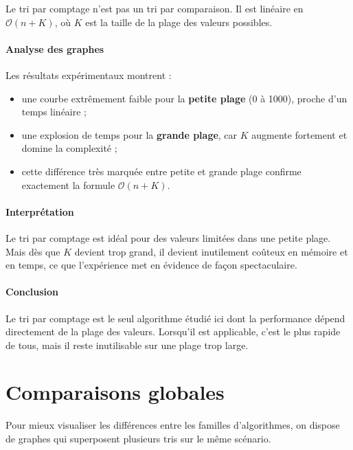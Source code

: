 \documentclass[11pt,a4paper]{article}
\begin{document}
Le tri par comptage n’est pas un tri par comparaison. Il est linéaire en
$\mathcal{O}(n + K)$, où $K$ est la taille de la plage des valeurs possibles.

\paragraph{Analyse des graphes}
Les résultats expérimentaux montrent :

\begin{itemize}
    \item une courbe extrêmement faible pour la \textbf{petite plage} (0 à 1000),
          proche d’un temps linéaire ;
    \item une explosion de temps pour la \textbf{grande plage},
          car $K$ augmente fortement et domine la complexité ;
    \item cette différence très marquée entre petite et grande plage confirme
          exactement la formule $\mathcal{O}(n + K)$.
\end{itemize}

\paragraph{Interprétation}
Le tri par comptage est idéal pour des valeurs limitées dans une petite plage.
Mais dès que $K$ devient trop grand, il devient inutilement coûteux en mémoire
et en temps, ce que l’expérience met en évidence de façon spectaculaire.

\paragraph{Conclusion}
Le tri par comptage est le seul algorithme étudié ici dont la performance dépend
directement de la plage des valeurs. Lorsqu’il est applicable, c’est le plus rapide
de tous, mais il reste inutilisable sur une plage trop large.


\section{Comparaisons globales}

Pour mieux visualiser les différences entre les familles d'algorithmes,
on dispose de graphes qui superposent plusieurs tris sur le même
scénario.
\end{document}
